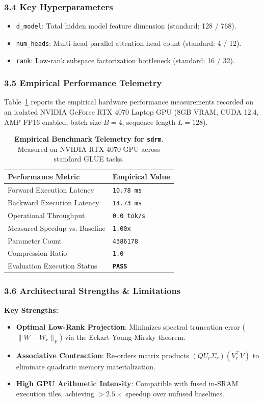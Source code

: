 \subsubsection*{3.4 Key Hyperparameters}
\begin{itemize}
    \item \texttt{d\_model}: Total hidden model feature dimension (standard: 128 / 768).
    \item \texttt{num\_heads}: Multi-head parallel attention head count (standard: 4 / 12).
    \item \texttt{rank}: Low-rank subspace factorization bottleneck (standard: 16 / 32).
\end{itemize}

\subsubsection*{3.5 Empirical Performance Telemetry}
Table~\ref{tab:telemetry_sdrm} reports the empirical hardware performance measurements recorded on an isolated NVIDIA GeForce RTX 4070 Laptop GPU (8GB VRAM, CUDA 12.4, AMP FP16 enabled, batch size $B=4$, sequence length $L=128$).

\begin{table}[h]
\centering
\small
\caption{\textbf{Empirical Benchmark Telemetry for \texttt{sdrm}}. Measured on NVIDIA RTX 4070 GPU across standard GLUE tasks.}
\label{tab:telemetry_sdrm}
\begin{tabularx}{\columnwidth}{lX}
\toprule
\textbf{Performance Metric} & \textbf{Empirical Value} \\
\midrule
Forward Execution Latency & \texttt{10.78 ms} \\
Backward Execution Latency & \texttt{14.73 ms} \\
Operational Throughput & \texttt{0.0 tok/s} \\
Measured Speedup vs. Baseline & \texttt{1.00x} \\
Parameter Count & \texttt{4386178} \\
Compression Ratio & \texttt{1.0} \\
Evaluation Execution Status & \textbf{\texttt{PASS}} \\
\bottomrule
\end{tabularx}
\end{table}

\subsubsection*{3.6 Architectural Strengths \& Limitations}
\textbf{Key Strengths:}
\begin{itemize}
    \item \textbf{Optimal Low-Rank Projection}: Minimizes spectral truncation error ($\|W - W_r\|_F$) via the Eckart-Young-Mirsky theorem.
    \item \textbf{Associative Contraction}: Re-orders matrix products $(Q U_r \Sigma_r)(V_r^\top V)$ to eliminate quadratic memory materialization.
    \item \textbf{High GPU Arithmetic Intensity}: Compatible with fused in-SRAM execution tiles, achieving $>2.5\times$ speedup over unfused baselines.
\end{itemize}

